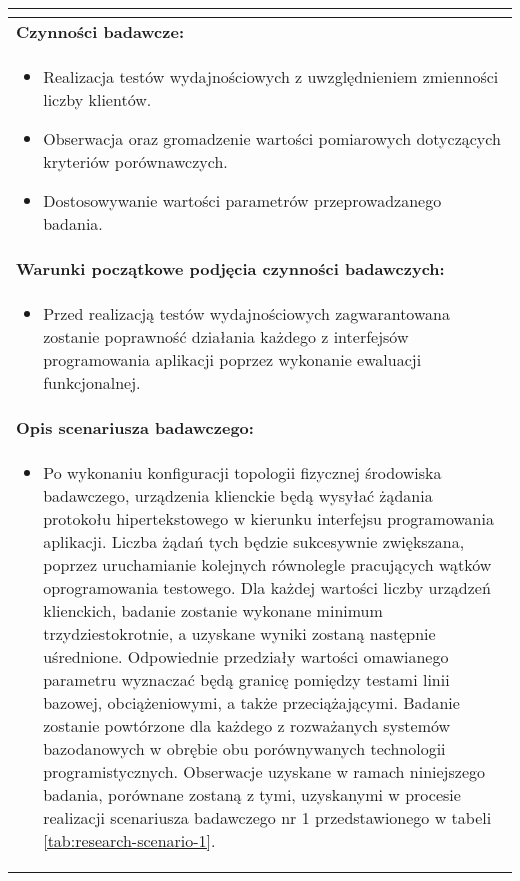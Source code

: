 \begin{longtable}[c]{|llll|}
{\begin{itemize}
        \end{itemize}}                                                           \\ \hline
    \multicolumn{4}{|l|}{\textbf{Czynności badawcze:}}                               \\ \hline
    \multicolumn{4}{|p{\linewidth}|}{
        \begin{itemize}
            \item Realizacja testów wydajnościowych z uwzględnieniem zmienności liczby klientów.
            \item Obserwacja oraz gromadzenie wartości pomiarowych dotyczących kryteriów porównawczych.
            \item Dostosowywanie wartości parametrów przeprowadzanego badania.
        \end{itemize}
    }                                                           \\ \hline
    \multicolumn{4}{|l|}{\textbf{Warunki początkowe podjęcia czynności badawczych:}} \\ \hline
    \multicolumn{4}{|p{\linewidth}|}{
        \begin{itemize}[label={}]
            \item Przed realizacją testów wydajnościowych zagwarantowana zostanie poprawność działania każdego z interfejsów programowania aplikacji poprzez wykonanie ewaluacji funkcjonalnej.
          \end{itemize}
    }                                                           \\ \hline
    \multicolumn{4}{|l|}{\textbf{Opis scenariusza badawczego:}}                      \\ \hline
    \multicolumn{4}{|p{\linewidth}|}{
        \begin{itemize}[label={}]
            \item Po wykonaniu konfiguracji topologii fizycznej środowiska badawczego, urządzenia klienckie będą wysyłać żądania protokołu hipertekstowego w kierunku interfejsu programowania aplikacji. Liczba żądań tych będzie sukcesywnie zwiększana, poprzez uruchamianie kolejnych równolegle pracujących wątków oprogramowania testowego. Dla każdej wartości liczby urządzeń klienckich, badanie zostanie wykonane minimum trzydziestokrotnie, a uzyskane wyniki zostaną następnie uśrednione. Odpowiednie przedziały wartości omawianego parametru wyznaczać będą granicę pomiędzy testami linii bazowej, obciążeniowymi, a także przeciążającymi. Badanie zostanie powtórzone dla każdego z rozważanych systemów bazodanowych w obrębie obu porównywanych technologii programistycznych. Obserwacje uzyskane w ramach niniejszego badania, porównane zostaną z tymi, uzyskanymi w procesie realizacji scenariusza badawczego nr 1 przedstawionego w tabeli \ref{tab:research-scenario-1}.

\end{itemize}}
\end{longtable}
